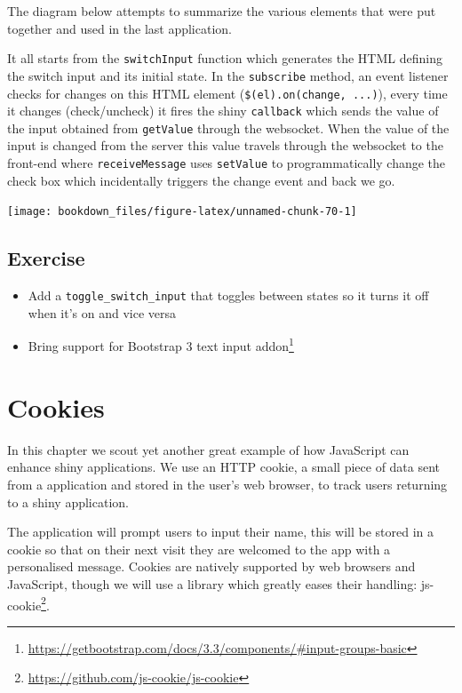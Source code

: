 \documentclass[
]{krantz}
\providecommand{\tightlist}{%
  \setlength{\itemsep}{0pt}\setlength{\parskip}{0pt}}
\renewcommand{\href}[2]{#2\footnote{\url{#1}}}
\begin{document}
The diagram below attempts to summarize the various elements that were put together and used in the last application.

It all starts from the \texttt{switchInput} function which generates the HTML defining the switch input and its initial state. In the \texttt{subscribe} method, an event listener checks for changes on this HTML element (\texttt{\$(el).on(\textquotesingle{}change\textquotesingle{},\ ...)}), every time it changes (check/uncheck) it fires the shiny \texttt{callback} which sends the value of the input obtained from \texttt{getValue} through the websocket. When the value of the input is changed from the server this value travels through the websocket to the front-end where \texttt{receiveMessage} uses \texttt{setValue} to programmatically change the check box which incidentally triggers the change event and back we go.

\begin{center}\texttt{[image: bookdown\_files/figure-latex/unnamed-chunk-70-1]} \end{center}

\hypertarget{shiny-input-excercise}{%
\section{Exercise}\label{shiny-input-excercise}}

\begin{itemize}
\tightlist
\item
  Add a \texttt{toggle\_switch\_input} that toggles between states so it turns it off when it's on and vice versa
\item
  Bring support for \href{https://getbootstrap.com/docs/3.3/components/\#input-groups-basic}{Bootstrap 3 text input addon}
\end{itemize}

\hypertarget{shiny-cookies}{%
\chapter{Cookies}\label{shiny-cookies}}

In this chapter we scout yet another great example of how JavaScript can enhance shiny applications. We use an HTTP cookie, a small piece of data sent from a application and stored in the user's web browser, to track users returning to a shiny application.

The application will prompt users to input their name, this will be stored in a cookie so that on their next visit they are welcomed to the app with a personalised message. Cookies are natively supported by web browsers and JavaScript, though we will use a library which greatly eases their handling: \href{https://github.com/js-cookie/js-cookie}{js-cookie}.
\end{document}
